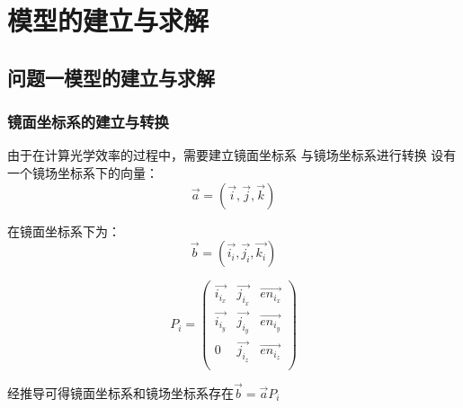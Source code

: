 \documentclass{数学建模}
\begin{document}
\section{模型的建立与求解}



\subsection{问题一模型的建立与求解}
\subsubsection{镜面坐标系的建立与转换}
由于在计算光学效率的过程中，需要建立镜面坐标系
与镜场坐标系进行转换
设有一个镜场坐标系下的向量：
\begin{equation}
    \overrightarrow{a} = (\overrightarrow{i},\overrightarrow{j},\overrightarrow{k})
\end{equation}

在镜面坐标系下为：
\begin{equation}
    \overrightarrow{b} = (\overrightarrow{i_i},\overrightarrow{j_i},\overrightarrow{k_i})
\end{equation}



\begin{equation}
    P_i = \begin{pmatrix}
        \overrightarrow{i_{i_x}} & \overrightarrow{j_{i_x}} & \overrightarrow{en_{i_x}} \\
        \overrightarrow{i_{i_y}}& \overrightarrow{j_{i_y}} & \overrightarrow{en_{i_y}} \\
            0 & \overrightarrow{j_{i_z}} & \overrightarrow{en_{i_z}} \\
    \end{pmatrix}
\end{equation}

经推导可得镜面坐标系和镜场坐标系存在$ \overrightarrow{b} = \overrightarrow{a} P_i$
\end{document}
